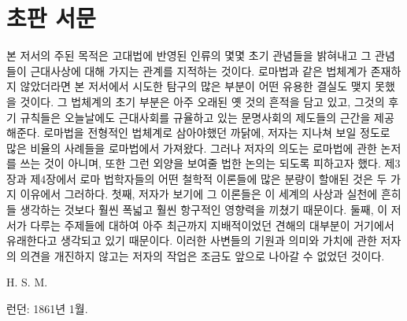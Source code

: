 \chapter*{초판 서문}

본 저서의 주된 목적은
고대법에 반영된 인류의 몇몇 초기 관념들을 밝혀내고
그 관념들이 근대사상에 대해 가지는 관계를 지적하는 것이다.
로마법과 같은 법체계가 존재하지 않았더라면
본 저서에서 시도한 탐구의 많은 부분이 어떤 유용한 결실도
맺지 못했을 것이다.
그 법체계의
초기 부분은 아주 오래된 옛 것의 흔적을 담고 있고,
그것의 후기 규칙들은 오늘날에도 근대사회를 규율하고 있는
문명사회의 제도들의 근간을 제공해준다.
로마법을 전형적인 법체계로 삼아야했던 까닭에,
저자는 지나쳐 보일 정도로 많은 비율의 사례들을
로마법에서 가져왔다.
그러나 저자의 의도는 로마법에 관한 논저를 쓰는 것이 아니며,
또한 그런 외양을 보여줄 법한 논의는 되도록 피하고자 했다.
제3장과 제4장에서
로마 법학자들의 어떤 철학적 이론들에 많은 분량이 할애된 것은
두 가지 이유에서 그러하다.
첫째, 저자가 보기에 그 이론들은
이 세계의 사상과 실천에
흔히들 생각하는 것보다
훨씬 폭넓고 훨씬 항구적인 영향력을 끼쳤기 때문이다.
둘째, 이 저서가 다루는 주제들에 대하여
아주 최근까지 지배적이었던 견해의 대부분이
거기에서 유래한다고 생각되고 있기 때문이다.
이러한 사변들의 기원과 의미와 가치에 관한
저자의 의견을 개진하지 않고는
저자의 작업은 조금도 앞으로 나아갈 수 없었던 것이다.

\begin{flushright}
H. S. M.
\end{flushright}

\begin{footnotesize}
런던: 1861년 1월.
\end{footnotesize}

